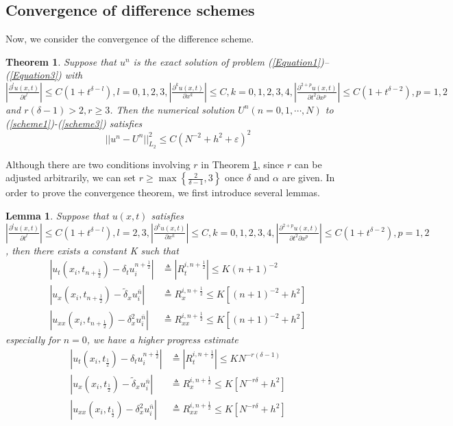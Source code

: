 \documentclass[10pt, reqno]{amsart}
\newtheorem{thm}{\bf Theorem}
\newenvironment{theorem}{\begin{thm}} {\end{thm}}
\newtheorem{lmm}{\bf Lemma}
\newenvironment{lemma}{\begin{lmm}}{\end{lmm}}
\theoremstyle{remark}
\theoremstyle{definition}
\numberwithin{table}{section}
\begin{document}
\subsection{Convergence of difference schemes}
Now,  we consider the convergence of the
difference scheme. 
\begin{theorem}\label{converge}
    Suppose that $u^n$ is the exact solution of problem (\ref{Equation1})–(\ref{Equation3}) with $\left|\frac{\partial^l u(x, t)}{\partial t^l}\right| \leq C(1+t^{\delta-l}),  l=0, 1, 2, 3, \left|\frac{\partial^k u(x, t)}{\partial x^k}\right| \leq C, k=0, 1, 2, 3, 4, \left|\frac{\partial^{2+p} u(x, t)}{\partial t^2\partial x^p}\right| \leq C(1+t^{\delta-2}), p=1, 2$ and $r(\delta-1) > 2, r\geq 3$.  Then the numerical solution  $U^n(n = 0,  1,  \cdots ,  N)$ to (\ref{scheme1})-(\ref{scheme3}) satisfies
    $$
    ||u^n-U^n||_{L_2}^2\leq C(N^{-2}+h^2+\varepsilon)^2
    $$
\end{theorem}
Although there are two conditions involving $r$ in Theorem \ref{converge},  since $ r $ can be adjusted arbitrarily,  we can set \( r \geq \max\left\{\frac{2}{\delta - 1},  3\right\} \) once \( \delta \) and \( \alpha \) are given.  In order to prove the convergence theorem,  we first introduce several lemmas. 
\begin{lemma} \label{second}
Suppose that $u(x, t)$ satisfies $\left|\frac{\partial^l u(x, t)}{\partial t^l}\right| \leq C(1+t^{\delta-l}),  l=2, 3, \left|\frac{\partial^k u(x, t)}{\partial x^k}\right| \leq C, k=0, 1, 2, 3, 4, \left|\frac{\partial^{2+p} u(x, t)}{\partial t^2\partial x^p}\right| \leq C(1+t^{\delta-2}), p=1, 2$ , then there exists a constant K such that
\begin{equation}
    \begin{aligned}
    |u_t\left(x_i,  t_{n+\frac{1}{2}}\right) -{\delta}_t u_i^{n+\frac{1}{2}}| &\triangleq{}|R_t^{i, n+\frac{1}{2}}|\leq K(n+1)^{-2}\\
    |u_x(x_i, t_{n+\frac{1}{2}})-\tilde{\delta}_x u_i^{\bar{n}}|&\triangleq{}R_x^{i, n+\frac{1}{2}}\leq K[(n+1)^{-2}+h^{2}]\\
    |u_{xx}(x_i, t_{n+\frac{1}{2}})-\delta_x^2u_i^{\bar{n}}|&\triangleq{}R_{xx}^{i, n+\frac{1}{2}}\leq K[(n+1)^{-2}+h^{2}]
    \end{aligned}
\end{equation}
especially for $n=0$, we have a higher progress estimate
\begin{equation}
\begin{aligned}
|u_t\left(x_i,  t_{\frac{1}{2}}\right) -{\delta}_t u_i^{n+\frac{1}{2}}| &\triangleq{}|R_t^{i, n+\frac{1}{2}}|\leq KN^{-r(\delta-1)}\\
    |u_x(x_i, t_{\frac{1}{2}})-\tilde{\delta}_x u_i^{\bar{n}}|&\triangleq{}R_x^{i, n+\frac{1}{2}}\leq K[N^{-r\delta}+h^{2}]\\
    |u_{xx}(x_i, t_{\frac{1}{2}})-\delta_x^2u_i^{\bar{n}}|&\triangleq{}R_{xx}^{i, n+\frac{1}{2}}\leq K[N^{-r\delta}+h^{2}] \label{spaceerror}\end{aligned}
\end{equation}
\end{lemma}
\end{document}

